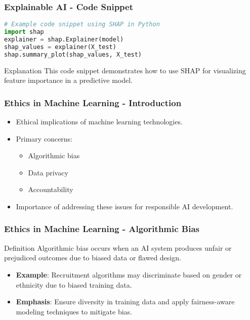 \documentclass{beamer}
\begin{document}
\begin{frame}[fragile]
    \frametitle{Explainable AI - Code Snippet}
    \begin{lstlisting}[language=Python]
# Example code snippet using SHAP in Python
import shap
explainer = shap.Explainer(model)
shap_values = explainer(X_test) 
shap.summary_plot(shap_values, X_test)
    \end{lstlisting}
    \begin{block}{Explanation}
        This code snippet demonstrates how to use SHAP for visualizing feature importance in a predictive model.
    \end{block}
\end{frame}

\begin{frame}[fragile]
    \frametitle{Ethics in Machine Learning - Introduction}
    \begin{itemize}
        \item Ethical implications of machine learning technologies.
        \item Primary concerns: 
        \begin{itemize}
            \item Algorithmic bias
            \item Data privacy
            \item Accountability
        \end{itemize}
        \item Importance of addressing these issues for responsible AI development.
    \end{itemize}
\end{frame}

\begin{frame}[fragile]
    \frametitle{Ethics in Machine Learning - Algorithmic Bias}
    \begin{block}{Definition}
        Algorithmic bias occurs when an AI system produces unfair or prejudiced outcomes due to biased data or flawed design.
    \end{block}
    \begin{itemize}
        \item \textbf{Example}: Recruitment algorithms may discriminate based on gender or ethnicity due to biased training data.
        \item \textbf{Emphasis}: Ensure diversity in training data and apply fairness-aware modeling techniques to mitigate bias.
    \end{itemize}
\end{frame}
\end{document}
